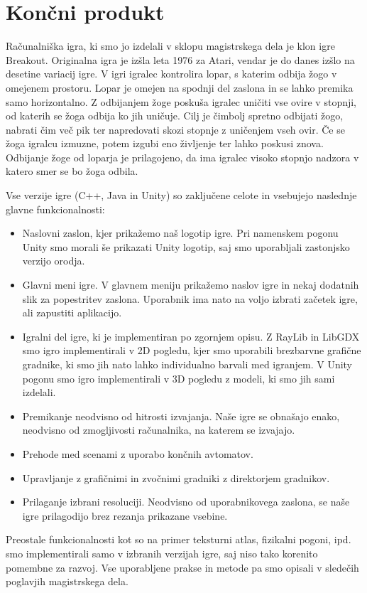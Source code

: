 \documentclass[12pt,a4paper,twoside]{book}
\begin{document}
\section{Končni produkt}
Računalniška igra, ki smo jo izdelali v sklopu magistrskega dela je klon igre Breakout. Originalna igra je izšla leta 1976 za Atari, vendar je do danes izšlo na desetine variacij igre. V igri igralec kontrolira lopar, s katerim odbija žogo v omejenem prostoru. Lopar je omejen na spodnji del zaslona in se lahko premika samo horizontalno. Z odbijanjem žoge poskuša igralec uničiti vse ovire v stopnji, od katerih se žoga odbija ko jih uničuje. Cilj je čimbolj spretno odbijati žogo, nabrati čim več pik ter napredovati skozi stopnje z uničenjem vseh ovir. Če se žoga igralcu izmuzne, potem izgubi eno življenje ter lahko poskusi znova. Odbijanje žoge od loparja je prilagojeno, da ima igralec visoko stopnjo nadzora v katero smer se bo žoga odbila.

Vse verzije igre (C++, Java in Unity) so zaključene celote in vsebujejo naslednje glavne funkcionalnosti:
\begin{itemize}
\item Naslovni zaslon, kjer prikažemo naš logotip igre. Pri namenskem pogonu Unity smo morali še prikazati Unity logotip, saj smo uporabljali zastonjsko verzijo orodja.
\item Glavni meni igre. V glavnem meniju prikažemo naslov igre in nekaj dodatnih slik za popestritev zaslona. Uporabnik ima nato na voljo izbrati začetek igre, ali zapustiti aplikacijo.
\item Igralni del igre, ki je implementiran po zgornjem opisu. Z RayLib in LibGDX smo igro implementirali v 2D pogledu, kjer smo uporabili brezbarvne grafične gradnike, ki smo jih nato lahko individualno barvali med igranjem. V Unity pogonu smo igro implementirali v 3D pogledu z modeli, ki smo jih sami izdelali.
\item Premikanje neodvisno od hitrosti izvajanja. Naše igre se obnašajo enako, neodvisno od zmogljivosti računalnika, na katerem se izvajajo.
\item Prehode med scenami z uporabo končnih avtomatov.
\item Upravljanje z grafičnimi in zvočnimi gradniki z direktorjem gradnikov.
\item Prilaganje izbrani resoluciji. Neodvisno od uporabnikovega zaslona, se naše igre prilagodijo brez rezanja prikazane vsebine.
\end{itemize}

Preostale funkcionalnosti kot so na primer teksturni atlas, fizikalni pogoni, ipd. smo implementirali samo v izbranih verzijah igre, saj niso tako korenito pomembne za razvoj. Vse uporabljene prakse in metode pa smo opisali v sledečih poglavjih magistrskega dela.
\end{document}
